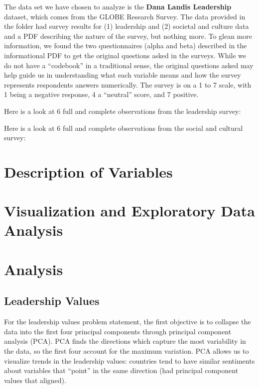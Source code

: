 \documentclass[
]{article}
\begin{document}
The data set we have chosen to analyze is the \textbf{Dana Landis
Leadership} dataset, which comes from the GLOBE Research Survey. The
data provided in the folder had survey results for (1) leadership and
(2) societal and culture data and a PDF describing the nature of the
survey, but nothing more. To glean more information, we found the two
questionnaires (alpha and beta) described in the informational PDF to
get the original questions asked in the surveys. While we do not have a
``codebook'' in a traditional sense, the original questions asked may
help guide us in understanding what each variable means and how the
survey represents respondents answers numerically. The survey is on a 1
to 7 scale, with 1 being a negative response, 4 a ``neutral'' score, and
7 positive.

Here is a look at 6 full and complete observations from the leadership
survey:

Here is a look at 6 full and complete observations from the social and
cultural survey:

\hypertarget{description-of-variables}{%
\section{Description of Variables}\label{description-of-variables}}

\hypertarget{visualization-and-exploratory-data-analysis}{%
\section{Visualization and Exploratory Data
Analysis}\label{visualization-and-exploratory-data-analysis}}

\hypertarget{analysis}{%
\section{Analysis}\label{analysis}}

\hypertarget{leadership-values}{%
\subsection{Leadership Values}\label{leadership-values}}

For the leadership values problem statement, the first objective is to
collapse the data into the first four principal components through
principal component analysis (PCA). PCA finds the directions which
capture the most variability in the data, so the first four account for
the maximum variation. PCA allows us to visualize trends in the
leadership values: countries tend to have similar sentiments about
variables that ``point'' in the same direction (had principal component
values that aligned).
\end{document}
